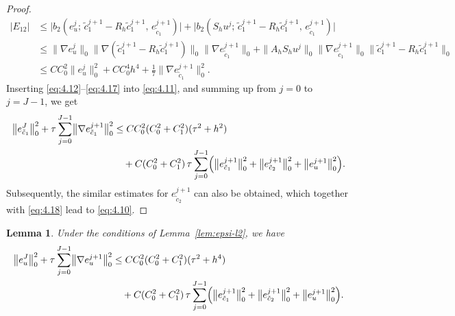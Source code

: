 \documentclass[a4paper,fleqn]{cas-sc}
\numberwithin{equation}{section}
\newtheorem{lemma}[theorem]{Lemma}
\theoremstyle{definition}
\begin{document}
\begin{proof}
\begin{align}
  |E_{12}|
  &\leq \bigl|b_{2}(e_{u}^{j};\, \tilde{c}_{1}^{j+1} - R_{h}\tilde{c}_{1}^{j+1},\,
                                   e_{\tilde{c}_{1}}^{j+1})\bigr|
       + \bigl|b_{2}(S_{h}u^{j};\, \tilde{c}_{1}^{j+1} - R_{h}\tilde{c}_{1}^{j+1},\,
                                    e_{\tilde{c}_{1}}^{j+1})\bigr|
  \nonumber\\
  &\leq \bigl\|\nabla e_{u}^{j}\bigr\|_{0}
         \bigl\|\nabla(\tilde{c}_{1}^{j+1} - R_{h}\tilde{c}_{1}^{j+1})\bigr\|_{0}
         \bigl\|\nabla e_{\tilde{c}_{1}}^{j+1}\bigr\|_{0}
       + \|A_{h}S_{h}u^{j}\|_{0}
         \bigl\|\nabla e_{\tilde{c}_{1}}^{j+1}\bigr\|_{0}
         \bigl\|\tilde{c}_{1}^{j+1} - R_{h}\tilde{c}_{1}^{j+1}\bigr\|_{0}
  \nonumber\\
  &\leq CC_{0}^{2}\bigl\|e_{u}^{j}\bigr\|_{0}^{2}
       + CC_{0}^{4}h^{4}
       + \frac{1}{7}\bigl\|\nabla e_{\tilde{c}_{1}}^{j+1}\bigr\|_{0}^{2}.
  \label{eq:4.17}
\end{align}
Inserting \eqref{eq:4.12}--\eqref{eq:4.17} into \eqref{eq:4.11}, and summing up from $j = 0$
to $j = J-1$, we get
\begin{align}
  \bigl\|e_{\tilde{c}_{1}}^{J}\bigr\|_{0}^{2}
  + \tau\sum_{j=0}^{J-1}\bigl\|\nabla e_{\tilde{c}_{1}}^{j+1}\bigr\|_{0}^{2}
  &\leq CC_{0}^{2}(C_{0}^{2}+C_{1}^{2})(\tau^{2}+h^{2})
  \nonumber\\
  &\quad + C(C_{0}^{2}+C_{1}^{2})\,\tau\sum_{j=0}^{J-1}
    \Bigl(\bigl\|e_{\tilde{c}_{1}}^{j+1}\bigr\|_{0}^{2}
         + \bigl\|e_{\tilde{c}_{2}}^{j+1}\bigr\|_{0}^{2}
         + \bigl\|e_{u}^{j+1}\bigr\|_{0}^{2}\Bigr).
  \label{eq:4.18}
\end{align}
Subsequently, the similar estimates for $e_{\tilde{c}_{2}}^{j+1}$ can also be obtained,
which together with \eqref{eq:4.18} lead to \eqref{eq:4.10}.
\end{proof}

\begin{lemma}\label{lem:eu-l2}
Under the conditions of Lemma~\ref{lem:epsi-l2}, we have
\begin{align}
  \bigl\|e_{u}^{J}\bigr\|_{0}^{2}
  + \tau\sum_{j=0}^{J-1}\bigl\|\nabla e_{u}^{j+1}\bigr\|_{0}^{2}
  &\leq CC_{0}^{2}(C_{0}^{2}+C_{1}^{2})(\tau^{2}+h^{4})
  \nonumber\\
  &\quad + C(C_{0}^{2}+C_{1}^{2})\,\tau\sum_{j=0}^{J-1}
    \Bigl(\bigl\|e_{\tilde{c}_{1}}^{j+1}\bigr\|_{0}^{2}
         + \bigl\|e_{\tilde{c}_{2}}^{j+1}\bigr\|_{0}^{2}
         + \bigl\|e_{u}^{j+1}\bigr\|_{0}^{2}\Bigr).
  \label{eq:4.19}
\end{align}
\end{lemma}
\end{document}
